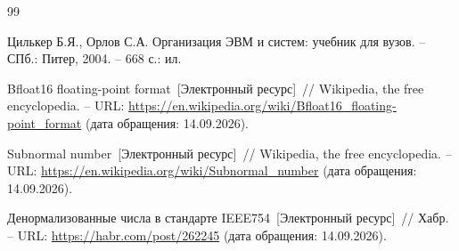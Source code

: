 

\begin{thebibliography}{99}

Цилькер Б.Я., Орлов С.А.
Организация ЭВМ и систем: учебник для вузов. –
СПб.: Питер, 2004. – 668 с.: ил.

Bfloat16 floating-point format~[Электронный ресурс]~//
Wikipedia, the free encyclopedia. –
URL: \url{https://en.wikipedia.org/wiki/Bfloat16_floating-point_format}
(дата обращения: 14.09.2026).

Subnormal number~[Электронный ресурс]~//
Wikipedia, the free encyclopedia. –
URL: \url{https://en.wikipedia.org/wiki/Subnormal_number}
(дата обращения: 14.09.2026).

Денормализованные числа в стандарте IEEE754~[Электронный ресурс]~//
Хабр. – URL: \url{https://habr.com/post/262245}
(дата обращения: 14.09.2026).

\end{thebibliography}

